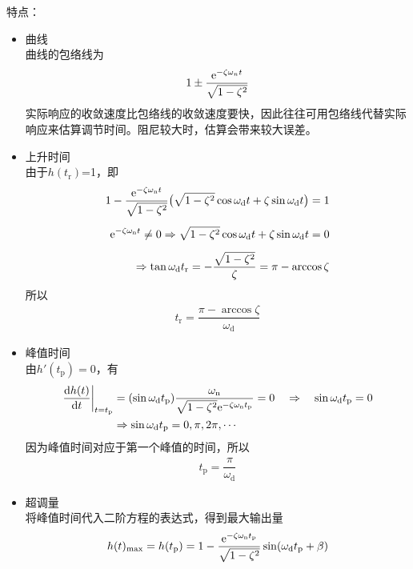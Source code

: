 \noindent 特点：
\begin{itemize}
	\item 曲线\\
	\hspace*{2em} 曲线的包络线为
	\begin{equation}
		1 \pm \dfrac{{\rm{e}}^{-\zeta \omega_n t}}{\sqrt{1 - \zeta^2}}
	\end{equation}
实际响应的收敛速度比包络线的收敛速度要快，因此往往可用包络线代替实际响应来估算调节时间。阻尼较大时，估算会带来较大误差。
	\item 上升时间\\
	\hspace*{2em}由于$h(t_\text{r})$=1，即
	\begin{align*}
		1 - \dfrac{{\rm{e}}^{-\zeta \omega_{\rm{n}} t} }{\sqrt{1 - \zeta^2}}\big(\sqrt{1 - \zeta^2}\cos \omega_\text{d}t + \zeta \sin \omega_\text{d}t\big) =  1\\[0.5em]
		{\rm{e}}^{-\zeta \omega_{\rm{n}} t} \neq 0 \Rightarrow \sqrt{1 - \zeta^2}\cos \omega_\text{d}t + \zeta \sin \omega_\text{d}t = 0\\[0.5em]
		\Rightarrow \tan \omega_\text{d} t_\text{r} = - \dfrac{\sqrt{1 - \zeta^2}}{\zeta} = \pi - \arccos \zeta
	\end{align*}
所以
\begin{align}
	t_\text{r} = \dfrac{\pi -\arccos \zeta}{\omega_\text{d}}
\end{align}
\item 峰值时间\\
\hspace*{2em}由$h'(t_\text{p}) = 0$，有
\begin{align*}
	\left. \dfrac{{\rm{d}} h(t)}{{\rm{d}} t}\right|_{t =t_\text{p}} &= (\sin \omega_\text{d} t_\text{p}) \dfrac{\omega_{\rm{n}}}{\sqrt{1 - \zeta^2} {\rm{e}}^{- \zeta \omega_{\rm{n}} t_\text{p}}} =0 \quad 
	\Rightarrow \quad \sin \omega_\text{d} t_\text{p} = 0\\
	&\Rightarrow \sin \omega_\text{d} t_\text{p} = 0, \pi, 2\pi , \cdots
\end{align*}
因为峰值时间对应于第一个峰值的时间，所以
\begin{align}
	 t_\text{p} = \dfrac{\pi}{\omega_\text{d}}
\end{align}
\item 超调量\\
\hspace*{2em} 将峰值时间代入二阶方程的表达式，得到最大输出量
\begin{align*}
	h(t)_{\max} = h(t_\text{p}) &= 1 - \dfrac{\e^{-\zeta \omega_\n t_\text{p}}}{\sqrt{1 - \zeta^2}}\sin (\omega_\text{d} t_\text{p} + \beta ) \\[0.5em]

\end{align*}
\end{itemize}
